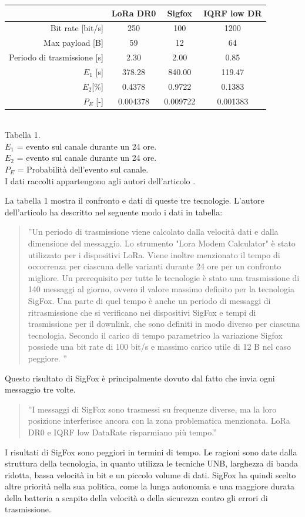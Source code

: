 \documentclass[a4paper]{report} %
\begin{document}
\begin{center}
\begin{tabular}{r|c|c|c|}
&LoRa DR0&Sigfox&IQRF low DR\\ \hline
Bit rate [bit/s]&250&100&1200\\ \hline
Max payload [B]&59&12&64\\ \hline
Periodo di trasmissione [s]&2.30&2.00&0.85\\ \hline
$E_1$ [s]&378.28&840.00&119.47\\ \hline
$E_2$[\%]&0.4378&0.9722&0.1383\\ \hline
$P_E$ [-]&0.004378&0.009722&0.001383\\ \hline
\end{tabular}
\\ 
Tabella 1. \\
$E_1$ = evento sul canale durante un 24 ore. \\
$E_2$ = evento sul canale durante un 24 ore. \\
$P_E$ = Probabilità dell'evento sul canale. \\
I dati raccolti appartengono agli autori dell'articolo \cite{art:rif.46}. \\

\end{center}
La tabella 1 mostra il confronto e dati di queste tre tecnologie. L'autore dell'articolo \cite{art:rif.46} ha descritto nel seguente modo i dati in tabella:
\begin{quote}
	''Un periodo di trasmissione viene calcolato dalla velocità dati e dalla dimensione del messaggio. Lo strumento "Lora Modem Calculator" è stato utilizzato per i dispositivi LoRa. Viene inoltre menzionato il tempo di occorrenza per ciascuna delle varianti durante 24 ore per un confronto migliore. Un prerequisito per tutte le tecnologie è stato una trasmissione di 140 messaggi al giorno, ovvero il valore massimo definito per la tecnologia SigFox. Una parte di quel tempo è anche un periodo di messaggi di ritrasmissione che si verificano nei dispositivi SigFox e tempi di trasmissione per il downlink, che sono definiti in modo diverso per ciascuna tecnologia. Secondo il carico di tempo parametrico la variazione Sigfox possiede una bit rate di 100 bit/s e massimo carico utile di 12 B nel caso peggiore. ''
\end{quote}
Questo risultato di SigFox è principalmente dovuto dal fatto che invia ogni messaggio tre volte. 
\begin{quote}
	''I messaggi di SigFox sono trasmessi su frequenze diverse, ma la loro posizione interferisce ancora con la zona problematica menzionata. LoRa DR0 e IQRF low DataRate risparmiano più tempo.''
\end{quote}
I risultati di SigFox sono peggiori in termini di tempo. Le ragioni sono date dalla struttura della tecnologia, in quanto utilizza le tecniche UNB, larghezza di banda ridotta, bassa velocità in bit e un piccolo volume di dati. SigFox ha quindi scelto altre priorità nella sua politica, come la lunga autonomia e una maggiore durata della batteria a scapito della velocità o della sicurezza contro gli errori di trasmissione.
\end{document}
